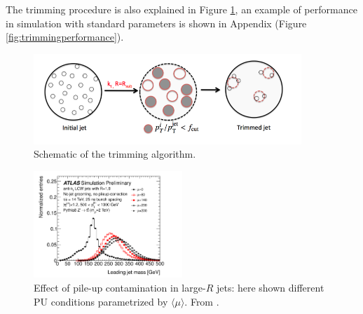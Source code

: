 The trimming procedure is also explained in Figure \ref{fig:trimming}, an example of performance in simulation with standard parameters is shown in Appendix (Figure \ref{fig:trimmingperformance}).

\begin{figure}[!ht]
  \centering
      \includegraphics[width=0.9\textwidth]{jet_part/grooming/Figura_4.png}
  \caption{Schematic of the trimming algorithm.}
  \label{fig:trimming}
\end{figure}


\begin{figure}[!ht]
  \centering
      \includegraphics[width=0.5\textwidth]{jet_part/Jet_ungroomed_mass_pt_500.png}
  \caption[Effect of pile-up contamination]{Effect of pile-up contamination in large-$R$ jets: here shown different PU conditions parametrized by $\langle\mu\rangle$. From \cite{highlumi}.}
  \label{fig:largejetpu}
\end{figure}


